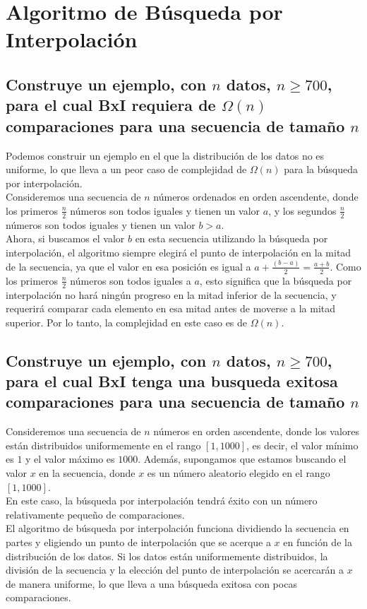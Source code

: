 \section{Algoritmo de Búsqueda por Interpolación}

\subsection{Construye un ejemplo, con $n$ datos, $n \geq 700$, para el cual BxI requiera de $\Omega(n)$ comparaciones para una secuencia de tamaño $n$}

Podemos construir un ejemplo en el que la distribución de los datos no es uniforme, lo que lleva a un peor caso de complejidad de $\Omega(n)$ para la búsqueda por interpolación.\\

Consideremos una secuencia de $n$ números ordenados en orden ascendente, donde los primeros $\frac{n}{2}$ números son todos iguales y tienen un valor $a$, y los segundos $\frac{n}{2}$ números son todos iguales y tienen un valor $b>a$.\\

Ahora, si buscamos el valor $b$ en esta secuencia utilizando la búsqueda por interpolación, el algoritmo siempre elegirá el punto de interpolación en la mitad de la secuencia, ya que el valor en esa posición es igual a $a + \frac{(b-a)}{2} = \frac{a+b}{2}$. Como los primeros $\frac{n}{2}$ números son todos iguales a $a$, esto significa que la búsqueda por interpolación no hará ningún progreso en la mitad inferior de la secuencia, y requerirá comparar cada elemento en esa mitad antes de moverse a la mitad superior. Por lo tanto, la complejidad en este caso es de $\Omega(n)$.\\

\subsection{Construye un ejemplo, con $n$ datos, $n \geq 700$, para el cual BxI tenga una busqueda exitosa comparaciones para una secuencia de tamaño $n$}

Consideremos una secuencia de $n$ números en orden ascendente, donde los valores están distribuidos uniformemente en el rango $[1,1000]$, es decir, el valor mínimo es $1$ y el valor máximo es $1000$. Además, supongamos que estamos buscando el valor $x$ en la secuencia, donde $x$ es un número aleatorio elegido en el rango $[1,1000]$.\\

En este caso, la búsqueda por interpolación tendrá éxito con un número relativamente pequeño de comparaciones.\\

El algoritmo de búsqueda por interpolación funciona dividiendo la secuencia en partes y eligiendo un punto de interpolación que se acerque a $x$ en función de la distribución de los datos. Si los datos están uniformemente distribuidos, la división de la secuencia y la elección del punto de interpolación se acercarán a $x$ de manera uniforme, lo que lleva a una búsqueda exitosa con pocas comparaciones.

